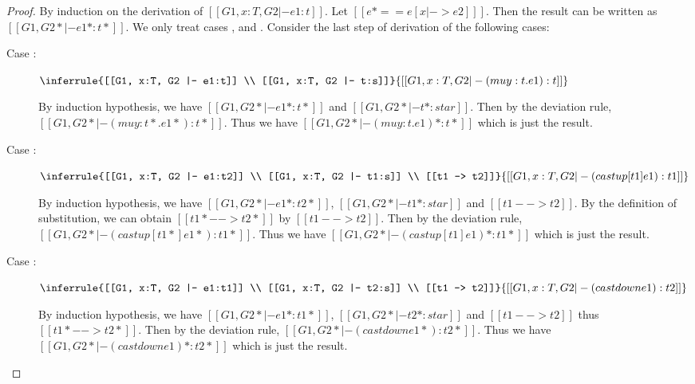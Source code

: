 \begin{proof}
    By induction on the derivation of $[[G1, x:T, G2 |- e1:t]]$. Let $[[e* == e
[x |-> e2] ]]$. Then the result can be written as $[[G1, G2* |- e1*  : t* ]]$.
We only treat cases ,  and
. Consider the last step of derivation of the following
cases:
    \begin{description}
        \item[Case :] $\inferrule{[[G1, x:T, G2 |- e1:t]] \\
[[G1, x:T, G2 |- t:s]]}{[[G1, x:T, G2 |- (mu y:t.e1): t]]}$ 
        
        By induction hypothesis, we have $[[G1, G2* |- e1* : t*]]$ and $[[G1,
G2* |- t* : star]]$. Then by the deviation rule, $[[G1, G2* |- (mu
y:t*.e1*):t*]]$. Thus we have $[[G1, G2* |- (mu y:t.e1)*:t*]]$ which is just
the result.
        \item[Case :] $\inferrule{[[G1, x:T, G2 |- e1:t2]]
\\ [[G1, x:T, G2 |- t1:s]] \\ [[t1 --> t2]]}{[[G1, x:T, G2 |- (castup [t1]
e1):t1]]}$ 
        
        By induction hypothesis, we have $[[G1, G2* |- e1*:t2*]]$, $[[G1, G2*
|- t1*:star]]$ and $[[t1 --> t2]]$. By the definition of substitution, we can
obtain $[[t1* --> t2*]]$ by $[[t1 --> t2]]$. Then by the deviation rule, $[[G1,
G2* |- (castup [t1*] e1*):t1*]]$. Thus we have $[[G1, G2* |- (castup [t1]
e1)*:t1*]]$ which is just the result.
        \item[Case :] $\inferrule{[[G1, x:T, G2 |- e1:t1]]
\\ [[G1, x:T, G2 |- t2:s]] \\ [[t1 --> t2]]}{[[G1, x:T, G2 |- (castdown
e1):t2]]}$ 
        
        By induction hypothesis, we have $[[G1, G2* |- e1*:t1*]]$, $[[G1, G2*
|- t2*:star]]$ and $[[t1 --> t2]]$ thus $[[t1* --> t2*]]$. Then by the
deviation rule, $[[G1, G2* |- (castdown e1*):t2*]]$. Thus we have $[[G1, G2* |-
(castdown e1)*:t2*]]$ which is just the result.
    \end{description}
\end{proof}

